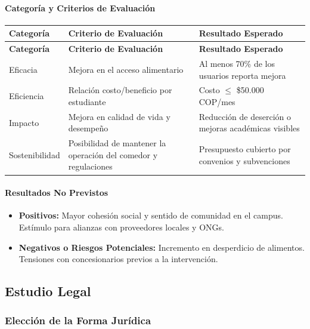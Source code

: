 \documentclass[letterpaper, 11pt]{report}
\begin{document}
\paragraph{Categoría y Criterios de Evaluación}
\begin{longtable}{|p{}|p{}|p{}|}
\hline
\textbf{Categoría} & \textbf{Criterio de Evaluación} & \textbf{Resultado Esperado} \\
\hline
\endfirsthead

\hline
\textbf{Categoría} & \textbf{Criterio de Evaluación} & \textbf{Resultado Esperado} \\
\hline
\endhead

\hline
\endfoot

\hline
\endlastfoot

Eficacia & Mejora en el acceso alimentario & Al menos 70\% de los usuarios reporta mejora \\
\hline
Eficiencia & Relación costo/beneficio por estudiante & Costo $\leq$ \$50.000 COP/mes \\
\hline
Impacto & Mejora en calidad de vida y desempeño & Reducción de deserción o mejoras académicas visibles \\
\hline
Sostenibilidad & Posibilidad de mantener la operación del comedor y regulaciones & Presupuesto cubierto por convenios y subvenciones \\
\hline
\end{longtable}

\paragraph{Resultados No Previstos}
\begin{itemize}
      \item \textbf{Positivos:} Mayor cohesión social y sentido de comunidad en el campus. Estímulo para alianzas con proveedores locales y ONGs.
      \item \textbf{Negativos o Riesgos Potenciales:} Incremento en desperdicio de alimentos. Tensiones con concesionarios previos a la intervención.
\end{itemize}

\subsection{Estudio Legal}

\subsubsection{Elección de la Forma Jurídica}
\end{document}
